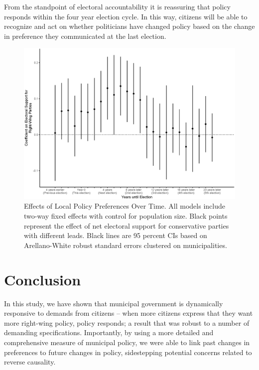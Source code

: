 \documentclass[a4paper,12pt]{article}
\begin{document}
From the standpoint of electoral accountability it is reassuring that policy responds within the four year election cycle. In this way, citizens will be able to recognize and act on whether politicians have changed policy based on the change in preference they communicated at the last election.

\begin{figure}[htbp]
	\centering
	\includegraphics[scale = .65]{dynamics.eps}
	\caption{Effects of Local Policy Preferences Over Time. All models include two-way fixed effects with control for population size. Black points represent the effect of net electoral support for conservative parties with different leads. Black lines are 95 percent CIs based on Arellano-White robust standard errors clustered on municipalities. }
	\label{fig:LongRun}
\end{figure}








\section*{Conclusion}

In this study, we have shown that municipal government is dynamically responsive to demands from citizens -- when more citizens express that they want more right-wing policy, policy responds; a result that was robust to a number of demanding specifications. Importantly, by using a more detailed and comprehensive measure of municipal policy, we were able to link past changes in preferences to future changes in policy, sidestepping potential concerns related to reverse causality. 
\end{document}
